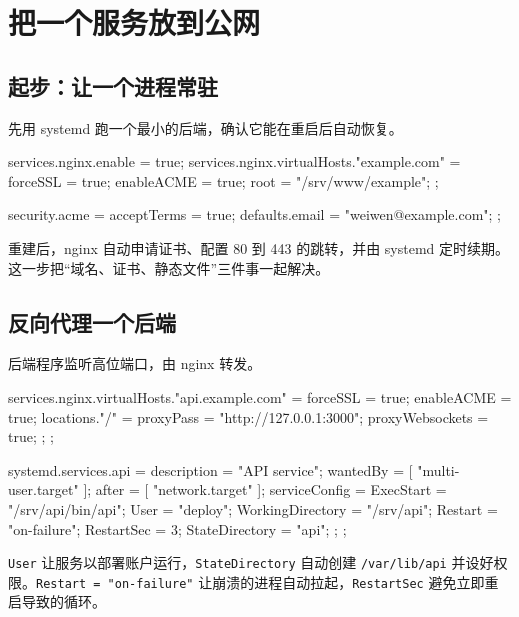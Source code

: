 \chapter{把一个服务放到公网}
\label{ch:public-service}

\section{起步：让一个进程常驻}

先用 systemd 跑一个最小的后端，确认它能在重启后自动恢复。

\begin{nixcode}
services.nginx.enable = true;
services.nginx.virtualHosts."example.com" = {
  forceSSL = true;
  enableACME = true;
  root = "/srv/www/example";
};

security.acme = {
  acceptTerms = true;
  defaults.email = "weiwen@example.com";
};
\end{nixcode}

重建后，nginx 自动申请证书、配置 80 到 443 的跳转，并由 systemd 定时续期。这一步把“域名、证书、静态文件”三件事一起解决。


\section{反向代理一个后端}

后端程序监听高位端口，由 nginx 转发。

\begin{nixcode}
services.nginx.virtualHosts."api.example.com" = {
  forceSSL = true;
  enableACME = true;
  locations."/" = {
    proxyPass = "http://127.0.0.1:3000";
    proxyWebsockets = true;
  };
};

systemd.services.api = {
  description = "API service";
  wantedBy = [ "multi-user.target" ];
  after = [ "network.target" ];
  serviceConfig = {
    ExecStart = "/srv/api/bin/api";
    User = "deploy";
    WorkingDirectory = "/srv/api";
    Restart = "on-failure";
    RestartSec = 3;
    StateDirectory = "api";
  };
};
\end{nixcode}

\texttt{User} 让服务以部署账户运行，\texttt{StateDirectory} 自动创建 \texttt{/var/lib/api} 并设好权限。\texttt{Restart = "on-failure"} 让崩溃的进程自动拉起，\texttt{RestartSec} 避免立即重启导致的循环。

